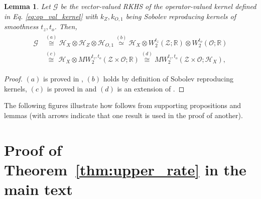 \documentclass[11pt]{article}
\newcommand{\calZ}{\mathcal{Z}}
\newcommand{\calH}{\mathcal{H}}
\newcommand{\calG}{\mathcal{G}}
\newcommand{\calO}{\mathcal{O}}
\newcommand{\0}{\mathbf{0}}
\newtheorem{lem}{Lemma}[section]
\begin{document}
\begin{appendix}
\begin{lem}\label{lem:equivalence_G}
    Let $\calG$ be the vector-valued RKHS of the operator-valued kernel defined in Eq. \eqref{eq:op_val_kernel} with $k_{Z}, k_{O, 1}$ being Sobolev reproducing kernels of smoothness $t_z, t_o$. Then, 
\begin{align}\label{eq:equivalence_RKHS_sobolev_space}
\begin{aligned}
    \calG &\overset{(a)}{\cong} \calH_{X} \otimes \calH_{Z} \otimes \calH_{O,1} \overset{(b)}{\simeq} \calH_{X} \otimes W^{t_z}_2(\calZ;\mathbb{R}) \otimes W^{t_o}_2(\calO;\mathbb{R}) \\
    &\overset{(c)}{\cong} \calH_{X} \otimes MW^{t_z, t_o}_2(\calZ\times\calO;\mathbb{R}) \overset{(d)}{\cong} MW^{t_z,t_o}_2(\calZ\times\calO;\calH_{X}),
\end{aligned}
\end{align}
\end{lem}
\begin{proof}
    $(a)$ is proved in \citet[Theorem 1]{JMLR:v25:23-1663}, $(b)$ holds by definition of Sobolev reproducing kernels, $(c)$ is proved in \citet[Theorem 12.7.2]{aubin2011applied} and $(d)$ is an extension of \citet[Theorem 12.7.1, Theorem 12.4.1]{aubin2011applied}. 
\end{proof}%
\newpage
\begin{center}
    {\LARGE {}}
\end{center}
The following figures illustrate how  follows from supporting propositions and lemmas (with arrows indicate that one result is used in the proof of another).
\begin{figure}[omitted: a diagram of this paper's results, not reproduced here]\end{figure}
\vspace{-5mm}
\begin{figure}[omitted: a diagram of this paper's results, not reproduced here]\end{figure}
\vspace{-5mm}
\begin{figure}[omitted: a diagram of this paper's results, not reproduced here]\end{figure}

\newpage%
\section{Proof of Theorem~\ref{thm:upper_rate} in the main text}\label{sec:proof_upper}





\end{appendix}
\end{document}
